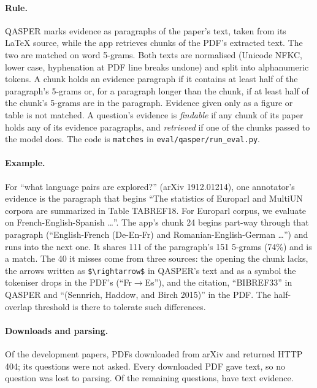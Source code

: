 \documentclass[11pt]{article}
\begin{document}
\paragraph{Rule.} QASPER marks evidence as paragraphs of the paper's text, taken from its
\LaTeX{} source, while the app retrieves chunks of the PDF's extracted text. The two are matched
on word 5-grams. Both texts are normalised (Unicode NFKC, lower case, hyphenation at PDF line
breaks undone) and split into alphanumeric tokens. A chunk holds an evidence paragraph if it
contains at least half of the paragraph's 5-grams or, for a paragraph longer than the chunk, if
at least half of the chunk's 5-grams are in the paragraph. Evidence given only as a figure or
table is not matched. A question's evidence is \emph{findable} if any chunk of its paper holds
any of its evidence paragraphs, and \emph{retrieved} if one of the chunks passed to the model
does. The code is \texttt{matches} in \texttt{eval/qasper/run\_eval.py}.

\paragraph{Example.} For ``what language pairs are explored?'' (arXiv 1912.01214), one
annotator's evidence is the paragraph that begins ``The statistics of Europarl and MultiUN corpora
are summarized in Table TABREF18. For Europarl corpus, we evaluate on French-English-Spanish
\ldots''. The app's chunk 24 begins part-way through that paragraph (``English-French
(De-En-Fr) and Romanian-English-German \ldots'') and runs into the next one. It shares 111 of the
paragraph's 151 5-grams (74\%) and is a match. The 40 it misses come from three sources: the
opening the chunk lacks, the arrows written as \verb|$\rightarrow$| in QASPER's text and as a
symbol the tokeniser drops in the PDF's (``Fr$\rightarrow$Es''), and the citation, ``BIBREF33'' in
QASPER and ``(Sennrich, Haddow, and Birch 2015)'' in the PDF. The half-overlap threshold is there
to tolerate such differences.

\paragraph{Downloads and parsing.} Of the \BaselinePapers{} development papers,
\PapersDownloaded{} PDFs downloaded from arXiv and \PapersFailed{} returned HTTP 404; its
\PapersFailedQuestions{} questions were not asked. Every downloaded PDF gave text, so no question
was lost to parsing. Of the remaining questions, \TextEvidenceQuestions{} have text evidence.
\end{document}

